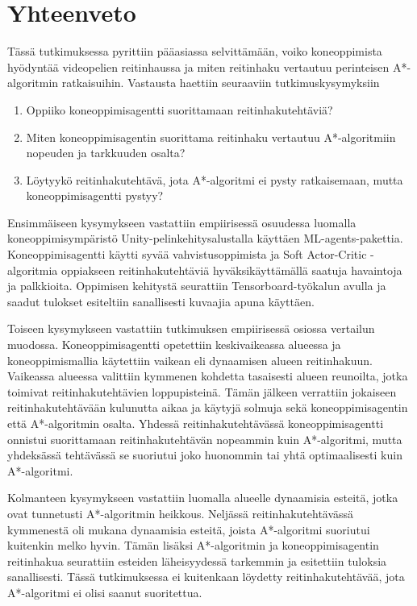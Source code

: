 \documentclass[utf8]{gradu3}
\begin{document}
\chapter{Yhteenveto}
\label{yhteenveto}

Tässä tutkimuksessa pyrittiin pääasiassa selvittämään, voiko koneoppimista hyödyntää videopelien reitinhaussa ja miten reitinhaku vertautuu perinteisen A*-algoritmin ratkaisuihin. Vastausta haettiin seuraaviin tutkimuskysymyksiin

\begin{enumerate}
\item Oppiiko koneoppimisagentti suorittamaan reitinhakutehtäviä?
\item Miten koneoppimisagentin suorittama reitinhaku vertautuu A*-algoritmiin nopeuden ja tarkkuuden osalta?
\item Löytyykö reitinhakutehtävä, jota A*-algoritmi ei pysty ratkaisemaan, mutta koneoppimisagentti pystyy?
\end{enumerate}

Ensimmäiseen kysymykseen vastattiin empiirisessä osuudessa luomalla koneoppimisympäristö Unity-pelinkehitysalustalla käyttäen ML-agents-pakettia. Koneoppimisagentti käytti syvää vahvistusoppimista ja Soft Actor-Critic -algoritmia oppiakseen reitinhakutehtäviä hyväksikäyttämällä saatuja havaintoja ja palkkioita. Oppimisen kehitystä seurattiin Tensorboard-työkalun avulla ja saadut tulokset esiteltiin sanallisesti kuvaajia apuna käyttäen.

Toiseen kysymykseen vastattiin tutkimuksen empiirisessä osiossa vertailun muodossa. Koneoppimisagentti opetettiin keskivaikeassa alueessa ja koneoppimismallia käytettiin vaikean eli dynaamisen alueen reitinhakuun. Vaikeassa alueessa valittiin kymmenen kohdetta tasaisesti alueen reunoilta, jotka toimivat reitinhakutehtävien loppupisteinä. Tämän jälkeen verrattiin jokaiseen reitinhakutehtävään kulunutta aikaa ja käytyjä solmuja sekä koneoppimisagentin että A*-algoritmin osalta. Yhdessä reitinhakutehtävässä koneoppimisagentti onnistui suorittamaan reitinhakutehtävän nopeammin kuin A*-algoritmi, mutta yhdeksässä tehtävässä se suoriutui joko huonommin tai yhtä optimaalisesti kuin A*-algoritmi.

Kolmanteen kysymykseen vastattiin luomalla alueelle dynaamisia esteitä, jotka ovat tunnetusti A*-algoritmin heikkous. Neljässä reitinhakutehtävässä kymmenestä oli mukana dynaamisia esteitä, joista A*-algoritmi suoriutui kuitenkin melko hyvin. Tämän lisäksi A*-algoritmin ja koneoppimisagentin reitinhakua seurattiin esteiden läheisyydessä tarkemmin ja esitettiin tuloksia sanallisesti. Tässä tutkimuksessa ei kuitenkaan löydetty reitinhakutehtävää, jota A*-algoritmi ei olisi saanut suoritettua.
\end{document}
